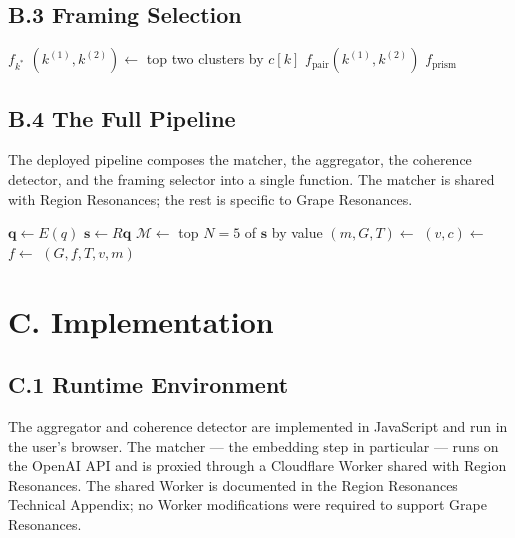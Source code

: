\documentclass[11pt]{article}
\begin{document}
\subsection*{B.3 Framing Selection}

\begin{algorithm}[H]
\caption{Frame}
\begin{algorithmic}[1]
    \State \Return $f_{k^{*}}$
  \EndIf
  \State $(k^{(1)}, k^{(2)}) \gets$ top two clusters by $c[k]$
    \State \Return $f_{\mathrm{pair}}(k^{(1)}, k^{(2)})$
  \EndIf
  \State \Return $f_{\mathrm{prism}}$
\EndFunction
\end{algorithmic}
\end{algorithm}

\subsection*{B.4 The Full Pipeline}

The deployed pipeline composes the matcher, the aggregator, the coherence detector, and the framing selector into a single function. The matcher is shared with Region Resonances; the rest is specific to Grape Resonances.

\begin{algorithm}[H]
\caption{Grape Resonances Pipeline}
\begin{algorithmic}[1]
  \State $\mathbf{q} \gets E(q)$  
  \State $\mathbf{s} \gets R \mathbf{q}$  
  \State $\mathcal{M} \gets$ top $N{=}5$ of $\mathbf{s}$ by value
  \State $(m, G, T) \gets$ 
  \State $(v, c) \gets$ 
  \State $f \gets$ 
  \State \Return $(G, f, T, v, m)$
\EndFunction
\end{algorithmic}
\end{algorithm}

\section*{C. Implementation}

\subsection*{C.1 Runtime Environment}
The aggregator and coherence detector are implemented in JavaScript and run in the user's browser. The matcher --- the embedding step in particular --- runs on the OpenAI API and is proxied through a Cloudflare Worker shared with Region Resonances. The shared Worker is documented in the Region Resonances Technical Appendix; no Worker modifications were required to support Grape Resonances.
\end{document}
